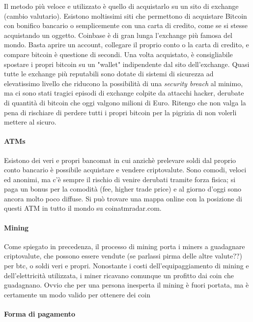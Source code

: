 \documentclass {article}
\begin{document}
Il metodo più veloce e utilizzato è quello di acquistarlo su un sito di exchange (cambio valutario). Esistono moltissimi siti che permettono di acquistare Bitcoin con bonifico bancario o semplicemente con una carta di credito, come se si stesse acquistando un oggetto.
Coinbase è di gran lunga l'exchange più famosa del mondo.
Basta aprire un account, collegare il proprio conto o la carta di credito, e compare bitcoin è questione di secondi.
Una volta acquistato, è consigliabile spostare i propri bitcoin su un "wallet" indipendente dal sito dell'exchange.
Quasi tutte le exchange più reputabili sono dotate di sistemi di sicurezza ad elevatissimo livello che riducono la possibilità di una \textit{security breach} al minimo, ma ci sono stati tragici episodi di exchange colpite da attacchi hacker, derubate di quantità di bitcoin che oggi valgono milioni di Euro.
Ritengo che non valga la pena di rischiare di perdere tutti i propri bitcoin per la pigrizia di non volerli mettere al sicuro.


\paragraph {ATMs}


Esistono dei veri e propri bancomat in cui anzichè prelevare soldi dal proprio conto bancario è possibile acquistare e vendere criptovalute.
Sono comodi, veloci ed anonimi, ma c'è sempre il rischio di venire derubati tramite forza fisica; si paga un bonus per la comodità (fee, higher trade price) e al giorno d'oggi sono ancora molto poco diffuse.
Si può trovare una mappa online con la posizione di questi ATM in tutto il mondo su coinatmradar.com.


\paragraph {Mining}


Come spiegato in precedenza, il processo di mining porta i miners a guadagnare criptovalute, che possono essere vendute (se parlassi pirma delle altre valute??) per btc, o soldi veri e propri.
Nonostante i costi dell'equipaggiamento di mining e dell'elettricità utilizzata, i miner ricavano comunque un profitto dai coin che guadagnano.
Ovvio che per una persona inesperta il mining è fuori portata, ma è certamente un modo valido per ottenere dei coin


\paragraph {Forma di pagamento}
\end{document}
